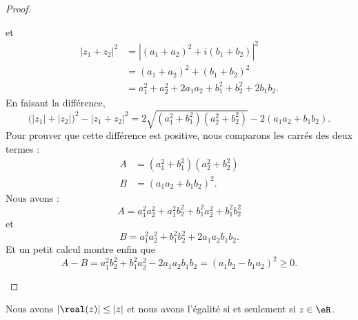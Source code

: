 \begin{proof}
\begin{subproof}
        et
        \begin{subequations}
            \begin{align}
            | z_1+z_2 |^2&=| (a_1+a_2)^2+i(b_1+b_2) |^2\\&
            =(a_1+a_2)^2+(b_1+b_2)^2\\
            &=a_1^2+a_2^2+2a_1a_2+b_1^2+b_2^2+2b_1b_2.
            \end{align}
        \end{subequations}
        En faisant la différence,
        \begin{equation}
            \big( | z_1 |+|z_2| \big)^2-| z_1+z_2 |^2=2\sqrt{ (a_1^2+b_1^2)(a_2^2+b_2^2) }-2(a_1a_2+b_1b_2).
        \end{equation}
        Pour prouver que cette différence est positive, nous comparons les carrés des deux termes : 
        \begin{subequations}
            \begin{align}
                A&=(a_1^2+b_1^2)(a_2^2+b_2^2)\\
                B&=(a_1a_2+b_1b_2)^2.
            \end{align}
        \end{subequations}
        Nous avons :
        \begin{equation}
            A=a_1^2a_2^2+a_1^2b_2^2+b_1^2a_2^2+b_1^2b_2^2
        \end{equation}
        et
        \begin{equation}
            B=a_1^2a_2^2+b_1^2b_2^2+2a_1a_2b_1b_2.
        \end{equation}
        Et un petit calcul montre enfin que
        \begin{equation}
            A-B=a_1^2b_2^2+b_1^2a_2^2-2a_1a_2b_1b_2=(a_1b_2-b_1a_2)^2\geq 0.
        \end{equation}
    \end{subproof}
\end{proof}


\begin{lemma}       \label{LEMooHTAWooQNrXSL}
    Nous avons \( | \real(z) |\leq | z |\) et nous avons l'égalité si et seulement si \( z\in \eR\).
\end{lemma}

